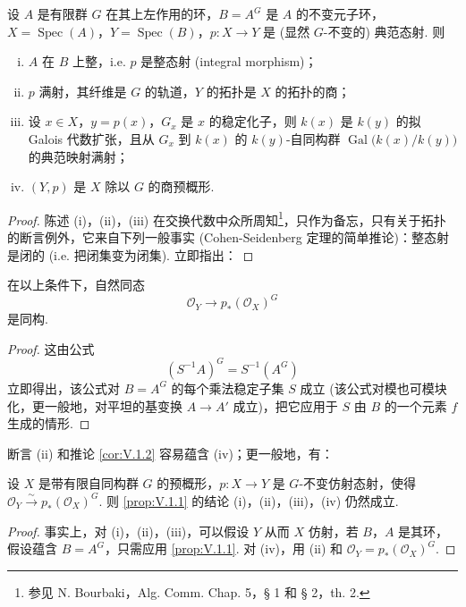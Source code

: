 \begin{proposition}\label{prop:V.1.1}
设 $A$ 是有限群 $G$ 在其上左作用的环，$B = A^{G}$ 是 $A$ 的不变元子环，$X = \operatorname{Spec}(A)$，$Y = \operatorname{Spec}(B)$，$p \colon X \to Y$ 是 (显然 $G$-不变的) 典范态射. 则
\begin{enumerate}[(i)]
\item $A$ 在 $B$ 上整，i.e. $p$ 是整态射 (integral morphism)；
\item $p$ 满射，其纤维是 $G$ 的轨道，$Y$ 的拓扑是 $X$ 的拓扑的商；
\item 设 $x \in X$，$y = p(x)$，$G_x$ 是 $x$ 的稳定化子，则 $k(x)$ 是 $k(y)$ 的拟 Galois 代数扩张，且从 $G_x$ 到 $k(x)$ 的 $k(y)$-自同构群 $\operatorname{Gal}\bigl(k(x)/k(y)\bigr)$ 的典范映射满射；
\item $(Y, p)$ 是 $X$ 除以 $G$ 的商预概形.
\end{enumerate}
\end{proposition}

\begin{proof}
陈述 (i)，(ii)，(iii) 在交换代数中众所周知\footnote{参见 N. Bourbaki，Alg. Comm. Chap. 5，§ 1 和 § 2，th. 2.}，只作为备忘，只有关于拓扑的断言例外，它来自下列一般事实 (Cohen-Seidenberg 定理的简单推论)：整态射是闭的 (i.e. 把闭集变为闭集). 立即指出：
\end{proof}

\begin{corollary}\label{cor:V.1.2}
在以上条件下，自然同态
\[
\mathcal{O}_Y \longrightarrow p_{*}(\mathcal{O}_X)^{G}
\]
是同构.
\end{corollary}

\begin{proof}
这由公式
\[
(S^{-1}A)^{G} = S^{-1}(A^{G})
\]
立即得出，该公式对 $B = A^{G}$ 的每个乘法稳定子集 $S$ 成立 (该公式对模也可模块化，更一般地，对平坦的基变换 $A \to A'$ 成立)，把它应用于 $S$ 由 $B$ 的一个元素 $f$ 生成的情形.
\end{proof}

断言 (ii) 和推论 \ref{cor:V.1.2} 容易蕴含 (iv)；更一般地，有：

\begin{proposition}\label{prop:V.1.3}
设 $X$ 是带有限自同构群 $G$ 的预概形，$p \colon X \to Y$ 是 $G$-不变仿射态射，使得 $\mathcal{O}_Y \stackrel{\sim}{\longrightarrow} p_{*}(\mathcal{O}_X)^{G}$. 则 \ref{prop:V.1.1} 的结论 (i)，(ii)，(iii)，(iv) 仍然成立.
\end{proposition}

\begin{proof}
事实上，对 (i)，(ii)，(iii)，可以假设 $Y$ 从而 $X$ 仿射，若 $B$，$A$ 是其环，假设蕴含 $B = A^{G}$，只需应用 \ref{prop:V.1.1}. 对 (iv)，用 (ii) 和 $\mathcal{O}_Y = p_{*}(\mathcal{O}_X)^{G}$.
\end{proof}

